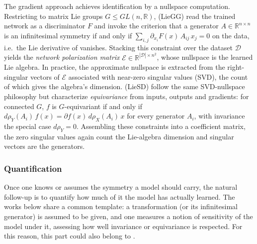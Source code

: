 \documentclass[mathematics,review,submit,moreauthors]{Definitions/mdpi}
\begin{document}
The gradient approach achieves identification by a nullspace computation.
Restricting to matrix Lie groups $G \leq GL(n,\mathbb{R})$, \citet{moskalev2023} (LieGG) read the trained network as a discriminator $F$ and invoke the criterion that a generator $A\in\mathbb{R}^{n\times n}$ is an infinitesimal symmetry if and only if $\sum_{i,j} \partial_{x_i} F(x)\,A_{ij}\, x_j = 0$ on the data, i.e.\ the Lie derivative of  vanishes.
Stacking this constraint over the dataset $\mathcal{D}$ yields the \emph{network polarization matrix} $\mathcal{E} \in \mathbb{R}^{|\mathcal{D}| \times n^2}$, whose nullspace is the learned Lie algebra.
In practice, the approximate nullspace is extracted from the right-singular vectors of $\mathcal{E}$ associated with near-zero singular values (SVD), the count of which gives the algebra's dimension.
\citet{hu2025nn} (LieSD) follow the same SVD-nullspace philosophy but characterize \emph{equivariance} from inputs, outputs and gradients: for connected $G$, $f$ is $G$-equivariant if and only if $d\rho_Y(A_i)\,f(x) = \partial f(x)\,d\rho_X(A_i)\,x$ for every generator $A_i$, with invariance the special case $d\rho_Y = 0$.
Assembling these constraints into a coefficient matrix, the zero singular values again count the Lie-algebra dimension and singular vectors are the generators.


\subsubsection{Quantification}\label{sec:sym-quantification}
Once one knows or assumes the symmetry a model should carry, the natural follow-up is to quantify how much of it the model has actually learned.
The works below share a common template: a transformation (or its infinitesimal generator) is assumed to be given, and one measures a notion of sensitivity of the model under it, assessing how well invariance or equivariance is respected.
For this reason, this part could also belong to .
\end{document}
